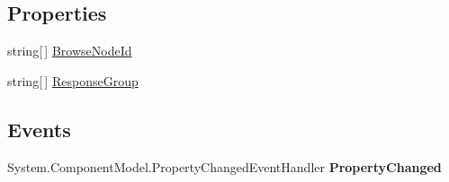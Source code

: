 \subsection*{Properties}
\begin{DoxyCompactItemize}
\item 
\hypertarget{class_price___comparison_1_1amazon_1_1ecs_1_1_browse_node_lookup_request_a345fb1ebec636c958cf9ccabfbf36c31}{string\mbox{[}$\,$\mbox{]} \hyperlink{class_price___comparison_1_1amazon_1_1ecs_1_1_browse_node_lookup_request_a345fb1ebec636c958cf9ccabfbf36c31}{Browse\-Node\-Id}}\label{class_price___comparison_1_1amazon_1_1ecs_1_1_browse_node_lookup_request_a345fb1ebec636c958cf9ccabfbf36c31}

\begin{DoxyCompactList}\small\item\em \end{DoxyCompactList}\item 
\hypertarget{class_price___comparison_1_1amazon_1_1ecs_1_1_browse_node_lookup_request_aadea7442760e4f7b51e05805af1e5c72}{string\mbox{[}$\,$\mbox{]} \hyperlink{class_price___comparison_1_1amazon_1_1ecs_1_1_browse_node_lookup_request_aadea7442760e4f7b51e05805af1e5c72}{Response\-Group}}\label{class_price___comparison_1_1amazon_1_1ecs_1_1_browse_node_lookup_request_aadea7442760e4f7b51e05805af1e5c72}

\begin{DoxyCompactList}\small\item\em \end{DoxyCompactList}\end{DoxyCompactItemize}
\subsection*{Events}
\begin{DoxyCompactItemize}
\item 
\hypertarget{class_price___comparison_1_1amazon_1_1ecs_1_1_browse_node_lookup_request_a08c5dfe3c3218573251ff1587a8e904c}{System.\-Component\-Model.\-Property\-Changed\-Event\-Handler {\bfseries Property\-Changed}}\label{class_price___comparison_1_1amazon_1_1ecs_1_1_browse_node_lookup_request_a08c5dfe3c3218573251ff1587a8e904c}

\end{DoxyCompactItemize}
